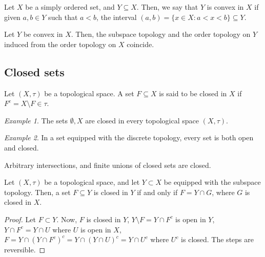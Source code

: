 \documentclass[11pt]{article}
\theoremstyle{definition}
\theoremstyle{remark}
\newtheorem*{example}{Example}
\numberwithin{equation}{section}
\begin{document}
    \begin{definition}
        Let $X$ be a simply ordered set, and $Y \subseteq X$. Then, we say that $Y$
        is convex in $X$ if given $a, b \in Y$ such that $a < b$, the interval $(a,
        b) = \{x \in X: a < x < b\} \subseteq Y$.
    \end{definition}

    \begin{theorem}
        Let $Y$ be convex in $X$. Then, the subspace topology and the order topology
        on $Y$ induced from the order topology on $X$ coincide.
    \end{theorem}


    \subsection{Closed sets}
    
    \begin{definition}
        Let $(X, \tau)$ be a topological space. A set $F \subseteq X$ is said to be
        closed in $X$ if $F^c = X\setminus F \in \tau$.
    \end{definition}
    \begin{example}
        The sets $\emptyset, X$ are closed in every topological space $(X, \tau)$.
    \end{example}
    \begin{example}
        In a set equipped with the discrete topology, every set is both open and
        closed.
    \end{example}

    \begin{lemma}
        Arbitrary intersections, and finite unions of closed sets are closed.
    \end{lemma}

    \begin{theorem}
        Let $(X, \tau)$ be a topological space, and let $Y \subset X$ be equipped
        with the subspace topology. Then, a set $F \subseteq Y$ is closed in $Y$ if
        and only if $F = Y \cap G$, where $G$ is closed in $X$.
    \end{theorem}
    \begin{proof}
        Let $F \subset Y$. Now, $F$ is closed in $Y$, $Y\setminus F = Y \cap F^c$ is
        open in $Y$, $Y \cap F^c = Y \cap U$ where $U$ is open in $X$, $F =
        Y \cap (Y \cap F^c)^c = Y \cap (Y \cap U)^c = Y \cap U^c$ where $U^c$ is
        closed. The steps are reversible.
    \end{proof}
\end{document}
